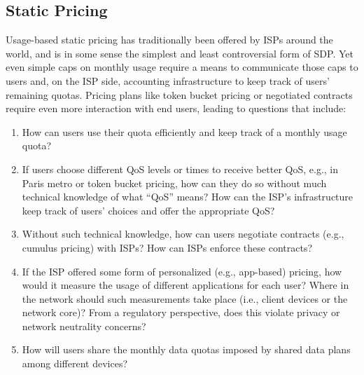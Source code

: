 \subsection{Static Pricing}

Usage-based static pricing has traditionally been offered by ISPs around the world, and is in some sense the simplest and least controversial form of SDP. Yet even simple caps on monthly usage require a means to communicate those caps to users and, on the ISP side, accounting infrastructure to keep track of users' remaining quotas. Pricing plans like token bucket pricing or negotiated contracts require even more interaction with end users, leading to questions that include:
\begin{enumerate}
\item
How can users use their quota efficiently and keep track of a monthly usage quota?
\item
If users choose different QoS levels or times to receive better QoS, e.g., in Paris metro or token bucket pricing, how can they do so without much technical knowledge of what ``QoS''  means? How can the ISP's infrastructure keep track of users' choices and offer the appropriate QoS?
\item
Without such technical knowledge, how can users negotiate contracts (e.g., cumulus pricing) with ISPs? How can ISPs enforce these contracts?
\item
If the ISP offered some form of personalized (e.g., app-based) pricing, how would it measure the usage of different applications for each user? Where in the network should such measurements take place (i.e., client devices or the network core)? From a regulatory perspective, does this violate privacy or network neutrality concerns?
\item
How will users share the monthly data quotas imposed by shared data plans among different devices?
\end{enumerate}

